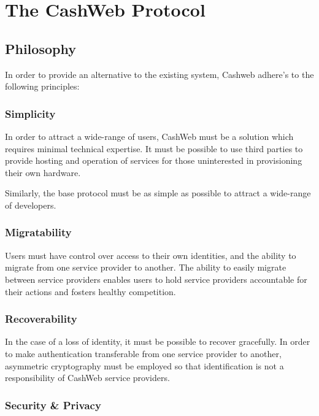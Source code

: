 \documentclass{article}
\begin{document}
\section{The CashWeb Protocol}

\subsection{Philosophy}

In order to provide an alternative to the existing system, Cashweb adhere's to the following principles:

\subsubsection{Simplicity}

In order to attract a wide-range of users, CashWeb must be a solution which requires minimal technical expertise. It must be possible to use third parties to provide hosting and operation of services for those uninterested in provisioning their own hardware.

Similarly, the base protocol must be as simple as possible to attract a wide-range of developers.

\subsubsection{Migratability}

Users must have control over access to their own identities, and the ability to migrate from one service provider to another. The ability to easily migrate between service providers enables users to hold service providers accountable for their actions and fosters healthy competition.

\subsubsection{Recoverability}

In the case of a loss of identity, it must be possible to recover gracefully. In order to make authentication transferable from one service provider to another, asymmetric cryptography must be employed so that identification is not a responsibility of CashWeb service providers.

\subsubsection{Security \& Privacy}
\end{document}
